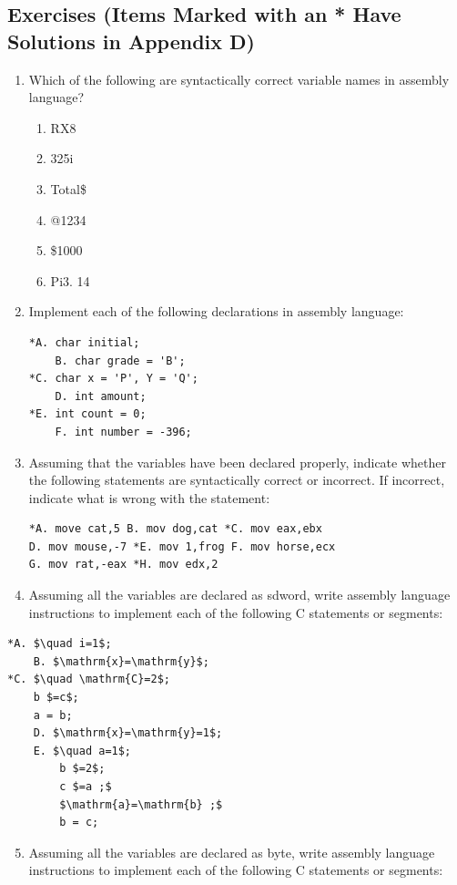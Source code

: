 \documentclass[10pt]{book}
\begin{document}
\subsection{Exercises (Items Marked with an * Have Solutions in Appendix D)}
\begin{enumerate}
  \item Which of the following are syntactically correct variable names in assembly language?
  \begin{enumerate}
    \item[*A.] RX8
    \item[B.] 325i
    \item[*C.] Total\$
    \item[D.] @1234
    \item[E.] \$1000
    \item[*F.] Pi3. 14
  \end{enumerate}
  \item Implement each of the following declarations in assembly language:
\begin{verbatim}
*A. char initial;
    B. char grade = 'B';
*C. char x = 'P', Y = 'Q';
    D. int amount;
*E. int count = 0;
    F. int number = -396;
\end{verbatim}
  \item Assuming that the variables have been declared properly, indicate whether the following statements are syntactically correct or incorrect. If incorrect, indicate what is wrong with the statement:
\begin{verbatim}
*A. move cat,5 B. mov dog,cat *C. mov eax,ebx
D. mov mouse,-7 *E. mov 1,frog F. mov horse,ecx
G. mov rat,-eax *H. mov edx,2
\end{verbatim}
  \item Assuming all the variables are declared as sdword, write assembly language instructions to implement each of the following C statements or segments:
\end{enumerate}
\begin{verbatim}
*A. $\quad i=1$;
    B. $\mathrm{x}=\mathrm{y}$;
*C. $\quad \mathrm{C}=2$;
    b $=c$;
    a = b;
    D. $\mathrm{x}=\mathrm{y}=1$;
    E. $\quad a=1$;
        b $=2$;
        c $=a ;$
        $\mathrm{a}=\mathrm{b} ;$
        b = c;
\end{verbatim}

\begin{enumerate}
  \setcounter{enumi}{4}
  \item Assuming all the variables are declared as byte, write assembly language instructions to implement each of the following C statements or segments:
\end{enumerate}
\end{document}
